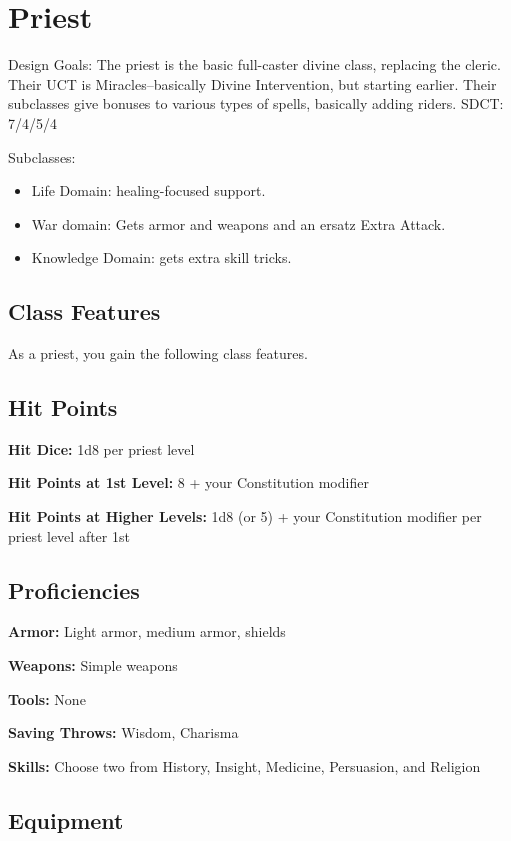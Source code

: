 \section{Priest}

Design Goals: The priest is the basic full-caster divine class, replacing the cleric. Their UCT is Miracles--basically Divine Intervention, but starting earlier. Their subclasses give bonuses to various types of spells, basically adding riders. SDCT: 7/4/5/4

Subclasses:
\begin{itemize}
	\item Life Domain: healing-focused support.
	\item War domain: Gets armor and weapons and an ersatz Extra Attack.
	\item Knowledge Domain: gets extra skill tricks.
\end{itemize}

\subsection{Class Features}

As a priest, you gain the following class features.

\subsection{Hit Points}

\textbf{Hit Dice:} 1d8 per priest level

\textbf{Hit Points at 1st Level:} 8 + your Constitution modifier

\textbf{Hit Points at Higher Levels:} 1d8 (or 5) + your Constitution modifier per priest level after 1st

\subsection{Proficiencies}

\textbf{Armor:} Light armor, medium armor, shields

\textbf{Weapons:} Simple weapons

\textbf{Tools:} None

\textbf{Saving Throws:} Wisdom, Charisma

\textbf{Skills:} Choose two from History, Insight, Medicine, Persuasion, and Religion

\subsection{Equipment}

